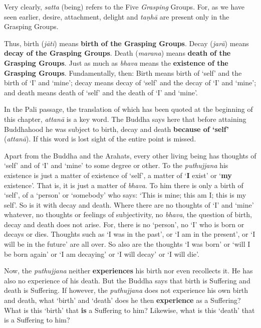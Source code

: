 Very clearly, \emph{satta} (being) refers to the Five \emph{Grasping} Groups. For, as we have seen earlier, desire, attachment, delight and \emph{taṇhā} are present only in the Grasping Groups.

Thus, birth (\emph{jāti}) means \textbf{birth of the Grasping Groups}. Decay (\emph{jarā}) means \textbf{decay of the Grasping Groups}. Death (\emph{marana}) means \textbf{death of the Grasping Groups}. Just as much as \emph{bhava} means the \textbf{existence of the Grasping Groups}. Fundamentally, then: Birth means birth of `self' and the birth of `I' and `mine'; decay means decay of `self' and the decay of `I' and `mine'; and death means death of `self' and the death of `I' and `mine'.

In the Pali passage, the translation of which has been quoted at the beginning of this chapter, \emph{attanā} is a key word. The Buddha says here that before attaining Buddhahood he was subject to birth, decay and death \textbf{because of `self'} (\emph{attanā}). If this word is lost sight of the entire point is missed.

Apart from the Buddha and the Arahats, every other living being has thoughts of `self' and of `I' and `mine' to some degree or other. To the \emph{puthujjana} his existence is just a matter of existence of `self', a matter of `\textbf{I} exist' or `\textbf{my} existence'. That is, it is just a matter of \emph{bhava}. To him there is only a birth of `self', of a `person' or `somebody' who says: `This is mine; this am I; this is my self'. So is it with decay and death. Where there are no thoughts of `I' and `mine' whatever, no thoughts or feelings of subjectivity, no \emph{bhava}, the question of birth, decay and death does not arise. For, there is no `person', no `I' who is born or decays or dies. Thoughts such as `I was in the past', or `I am in the present', or `I will be in the future' are all over. So also are the thoughts `I was born' or `will I be born again' or `I am decaying' or `I will decay' or `I will die'.

Now, the \emph{puthujjana} neither \textbf{experiences} his birth nor even recollects it. He has also no experience of his death. But the Buddha says that birth is Suffering and death is Suffering. If however, the \emph{puthujjana} does not experience his own birth and death, what `birth' and `death' does he then \textbf{experience} as a Suffering? What is this `birth' that \textbf{is} a Suffering to him? Likewise, what is this `death' that is a Suffering to him?

